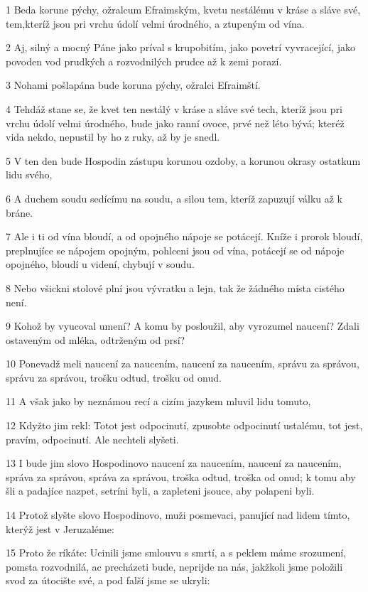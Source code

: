 \par 1 Beda korune pýchy, ožralcum Efraimským, kvetu nestálému v kráse a sláve své, tem,kteríž jsou pri vrchu údolí velmi úrodného, a ztupeným od vína.
\par 2 Aj, silný a mocný Páne jako príval s krupobitím, jako povetrí vyvracející, jako povoden vod prudkých a rozvodnilých prudce až k zemi porazí.
\par 3 Nohami pošlapána bude koruna pýchy, ožralci Efraimští.
\par 4 Tehdáž stane se, že kvet ten nestálý v kráse a sláve své tech, kteríž jsou pri vrchu údolí velmi úrodného, bude jako ranní ovoce, prvé než léto bývá; kteréž vida nekdo, nepustil by ho z ruky, až by je snedl.
\par 5 V ten den bude Hospodin zástupu korunou ozdoby, a korunou okrasy ostatkum lidu svého,
\par 6 A duchem soudu sedícímu na soudu, a silou tem, kteríž zapuzují válku až k bráne.
\par 7 Ale i ti od vína bloudí, a od opojného nápoje se potácejí. Kníže i prorok bloudí, preplnujíce se nápojem opojným, pohlceni jsou od vína, potácejí se od nápoje opojného, bloudí u videní, chybují v soudu.
\par 8 Nebo všickni stolové plní jsou vývratku a lejn, tak že žádného místa cistého není.
\par 9 Kohož by vyucoval umení? A komu by posloužil, aby vyrozumel naucení? Zdali ostaveným od mléka, odtrženým od prsí?
\par 10 Ponevadž meli naucení za naucením, naucení za naucením, správu za správou, správu za správou, trošku odtud, trošku od onud.
\par 11 A však jako by neznámou recí a cizím jazykem mluvil lidu tomuto,
\par 12 Kdyžto jim rekl: Totot jest odpocinutí, zpusobte odpocinutí ustalému, tot jest, pravím, odpocinutí. Ale nechteli slyšeti.
\par 13 I bude jim slovo Hospodinovo naucení za naucením, naucení za naucením, správa za správou, správa za správou, troška odtud, troška od onud; k tomu aby šli a padajíce nazpet, setríni byli, a zapleteni jsouce, aby polapeni byli.
\par 14 Protož slyšte slovo Hospodinovo, muži posmevaci, panující nad lidem tímto, kterýž jest v Jeruzaléme:
\par 15 Proto že ríkáte: Ucinili jsme smlouvu s smrtí, a s peklem máme srozumení, pomsta rozvodnilá, ac precházeti bude, neprijde na nás, jakžkoli jsme položili svod za útocište své, a pod falší jsme se ukryli:
